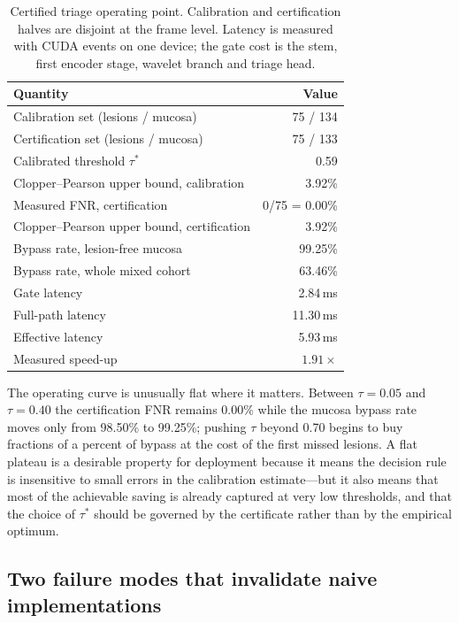 \documentclass[journal]{IEEEtran}
\begin{document}
\begin{table}[t]
\centering
\caption{Certified triage operating point. Calibration and certification halves are disjoint at the frame level. Latency is measured with CUDA events on one device; the gate cost is the stem, first encoder stage, wavelet branch and triage head.}
\label{tab:triage}
\begin{tabular}{lr}
\toprule
Quantity & Value \\
\midrule
Calibration set (lesions / mucosa) & 75 / 134 \\
Certification set (lesions / mucosa) & 75 / 133 \\
Calibrated threshold $\tau^{*}$ & 0.59 \\
Clopper--Pearson upper bound, calibration & 3.92\% \\
Measured FNR, certification & 0/75 = 0.00\% \\
Clopper--Pearson upper bound, certification & 3.92\% \\
Bypass rate, lesion-free mucosa & 99.25\% \\
Bypass rate, whole mixed cohort & 63.46\% \\
Gate latency & 2.84\,ms \\
Full-path latency & 11.30\,ms \\
Effective latency & 5.93\,ms \\
Measured speed-up & $1.91\times$ \\
\bottomrule
\end{tabular}
\end{table}

The operating curve is unusually flat where it matters. Between $\tau=0.05$ and $\tau=0.40$ the certification FNR remains 0.00\% while the mucosa bypass rate moves only from 98.50\% to 99.25\%; pushing $\tau$ beyond 0.70 begins to buy fractions of a percent of bypass at the cost of the first missed lesions. A flat plateau is a desirable property for deployment because it means the decision rule is insensitive to small errors in the calibration estimate---but it also means that most of the achievable saving is already captured at very low thresholds, and that the choice of $\tau^{*}$ should be governed by the certificate rather than by the empirical optimum.

\subsection{Two failure modes that invalidate naive implementations}
\end{document}
